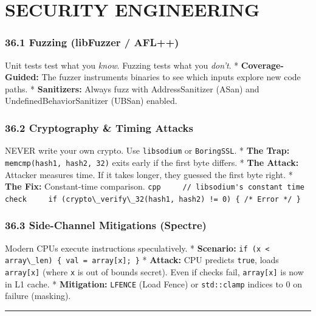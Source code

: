 \hypertarget{security-engineering}{%
\chapter{SECURITY ENGINEERING}\label{security-engineering}}

\hypertarget{fuzzing-libfuzzer-afl}{%
\subsection{36.1 Fuzzing (libFuzzer /
AFL++)}\label{fuzzing-libfuzzer-afl}}

Unit tests test what you \emph{know}. Fuzzing tests what you
\emph{don't}. * \textbf{Coverage-Guided:} The fuzzer instruments
binaries to see which inputs explore new code paths. *
\textbf{Sanitizers:} Always fuzz with AddressSanitizer (ASan) and
UndefinedBehaviorSanitizer (UBSan) enabled.

\hypertarget{cryptography-timing-attacks}{%
\subsection{36.2 Cryptography \& Timing
Attacks}\label{cryptography-timing-attacks}}

NEVER write your own crypto. Use \passthrough{\lstinline!libsodium!} or
\passthrough{\lstinline!BoringSSL!}. * \textbf{The Trap:}
\passthrough{\lstinline!memcmp(hash1, hash2, 32)!} exits early if the
first byte differs. * \textbf{The Attack:} Attacker measures time. If it
takes longer, they guessed the first byte right. * \textbf{The Fix:}
Constant-time comparison.
\passthrough{\lstinline"cpp     // libsodium's constant time check     if (crypto\_verify\_32(hash1, hash2) != 0) \{ /* Error */ \}"}

\hypertarget{side-channel-mitigations-spectre}{%
\subsection{36.3 Side-Channel Mitigations
(Spectre)}\label{side-channel-mitigations-spectre}}

Modern CPUs execute instructions speculatively. * \textbf{Scenario:}
\passthrough{\lstinline!if (x < array\_len) \{ val = array[x]; \}!} *
\textbf{Attack:} CPU predicts \passthrough{\lstinline!true!}, loads
\passthrough{\lstinline!array[x]!} (where \passthrough{\lstinline!x!} is
out of bounds secret). Even if checks fail,
\passthrough{\lstinline!array[x]!} is now in L1 cache. *
\textbf{Mitigation:} \passthrough{\lstinline!LFENCE!} (Load Fence) or
\passthrough{\lstinline!std::clamp!} indices to 0 on failure (masking).

\begin{center}\rule{0.5\linewidth}{0.5pt}\end{center}
